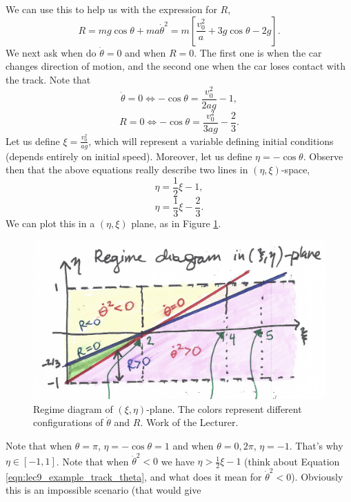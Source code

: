 We can use this to help us with the expression for $R$,
\begin{equation}
  R = mg\cos\theta +ma\dot{\theta}^2 = m\left[ \frac{v_0^2}{a}+3g\cos\theta -2g
  \right].
  \label{eqn:lec9_example_track_R}
\end{equation}
We next ask when do $\dot{\theta}=0$ and when $R=0$. The first one is when the
car changes direction of motion, and the second one when the car loses contact
with the track. 
 Note that 
\[\dot{\theta}=0 \iff -\cos\theta= \frac{v_0^2}{2ag}-1,\]
\[R=0 \iff -\cos\theta = \frac{v_0^2}{3ag}-\frac{2}{3}.\]
Let us define $\xi=\frac{v_0^2}{ag}$, which will represent a variable defining
initial conditions (depends entirely on initial speed). Moreover, let us define
$\eta=-\cos\theta$. Observe then that the above equations really describe two
lines in $(\eta,\xi)$-space,
\[\eta=\frac{1}{2}\xi -1,\]
\[\eta=\frac{1}{3}\xi -\frac{2}{3}.\]
We can plot this in a $(\eta,\xi)$ plane, as in Figure
\ref{fig:lec9_example_regime}.
\begin{figure}[h]
  \centering
  \includegraphics[width=\textwidth]{media/lec9_example_regime}
  \caption{Regime diagram of $(\xi,\eta)$-plane. The colors represent different
  configurations of $\dot{\theta}$ and $R$. Work of the Lecturer.}
  \label{fig:lec9_example_regime}
\end{figure}
Note that when $\theta=\pi$, $\eta=-\cos\theta=1$ and when $\theta=0,2\pi$,
$\eta=-1$. That's why $\eta\in[-1,1]$. Note that when $\dot{\theta}^2<0$ we have
$\eta>\frac{1}{2}\xi-1$ (think about Equation
\ref{eqn:lec9_example_track_theta}, and what does it mean for
$\dot{\theta}^2<0$). Obviously this is an impossible scenario (that would give
